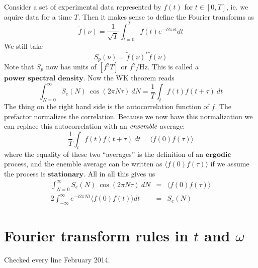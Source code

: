 \documentclass{article}
\begin{document}
Consider a set of experimental data represented by $f(t)$ for $t\in[0,T]$,
ie. we aquire data for a time $T$. Then it makes sense to define
the Fourier transforms as\[
\tilde{f}(\nu)=\frac{1}{\sqrt{T}}\int_{t=0}^{T}f(t)e^{-i2\pi\nu t}dt\]
 We still take\[
S_{p}(\nu)=\tilde{f}(\nu)^{*}\tilde{f}(\nu)\]
 Note that $S_{p}$ now has units of $[f^{2}T]$ or $f^{2}/\textrm{Hz}$.
This is called a $\textbf{power spectral density}$. Now the WK theorem
reads\[
\int_{N=0}^{\infty}S_{e}(N)\:\cos\left(2\pi N\tau\right)\: dN=\frac{1}{T}\int_{t}f(t)f(t+\tau)\: dt\]
 The thing on the right hand side is the autocorrelation function
of $f$. The prefactor normalizes the correlation. Because we now
have this normalization we can replace this autocorrelation with an
$\emph{ensemble}$ average:\[
\frac{1}{T}\int_{t}f(t)f(t+\tau)\: dt=\langle f(0)f(\tau)\rangle\]
 where the equality of these two {}``averages'' is the definition
of an $\textbf{ergodic}$ process, and the enemble average can be
written as $\langle f(0)f(\tau)\rangle$ if we assume the process
is $\textbf{stationary}$. All in all this gives us\begin{eqnarray*}
\int_{N=0}^{\infty}S_{e}(N)\:\cos\left(2\pi N\tau\right)\: dN & = & \langle f(0)f(\tau)\rangle\\
2\int_{-\infty}^{\infty}e^{-i2\pi Nt}\langle f(0)f(t)\rangle dt & = & S_{e}(N)\end{eqnarray*}


\section*{Fourier transform rules in $t$ and $\omega$}

Checked every line February 2014.
\end{document}
